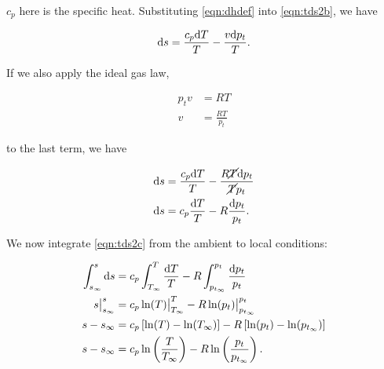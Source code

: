 \where \(c_p\) here is the specific heat.
%
Substituting \cref{eqn:dhdef} into \cref{eqn:tds2b}, we have

\begin{equation}
   \mathrm{d} s = \frac{c_p \mathrm{d} T}{T} - \frac{v \mathrm{d} p_t}{T}.
\end{equation}

\noindent If we also apply the ideal gas law,

\begin{equation}
    \begin{aligned}
        p_tv &= RT \\
        v &= \frac{RT}{p_t}
    \end{aligned}
\end{equation}

\noindent to the last term, we have

\begin{equation}
    \label{eqn:tds2c}
    \begin{aligned}
        \mathrm{d} s &= \frac{c_p \mathrm{d} T}{T} - \frac{R\cancel{T} \mathrm{d} p_t}{\cancel{T}p_t} \\
        \mathrm{d} s &= c_p\frac{\mathrm{d} T}{T} - R\frac{\mathrm{d} p_t}{p_t}. \\
\end{aligned}
\end{equation}

We now integrate \cref{eqn:tds2c} from the ambient to local conditions:

\begin{equation}
    \begin{aligned}
        \int_{s_\infty}^s \mathrm{d} s &= c_p \int_{T_\infty}^T \frac{\mathrm{d} T}{T} - R \int_{p_{t_\infty}}^{p_t} \frac{\mathrm{d} p_t}{p_t} \\
        s\big|_{s_\infty}^s &= c_p \ln(T)\big|_{T_\infty}^T - R \ln(p_t)\big|_{p_{t_\infty}}^{p_t} \\
        s-s_\infty &= c_p \left[\ln(T) - \ln(T_\infty)\right] - R \left[\ln(p_t) - \ln(p_{t_\infty})\right] \\
        s-s_\infty &= c_p \ln\left(\frac{T}{T_\infty}\right) - R \ln\left(\frac{p_t}{p_{t_\infty}}\right).
    \end{aligned}
\end{equation}



